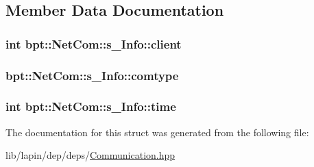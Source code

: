 \subsection{Member Data Documentation}
\hypertarget{structbpt_1_1_net_com_1_1s___info_ae2ea56fb236b6a24a720751e0b70b1d1}{
\subsubsection[{client}]{ {\bf int} bpt\-::\-Net\-Com\-::s\-\_\-\-Info\-::client}}\label{structbpt_1_1_net_com_1_1s___info_ae2ea56fb236b6a24a720751e0b70b1d1}
\hypertarget{structbpt_1_1_net_com_1_1s___info_a04de21638bff33bd3459fc95e34f07c7}{
\subsubsection[{comtype}]{ bpt\-::\-Net\-Com\-::s\-\_\-\-Info\-::comtype}}\label{structbpt_1_1_net_com_1_1s___info_a04de21638bff33bd3459fc95e34f07c7}
\hypertarget{structbpt_1_1_net_com_1_1s___info_ad76e1792d9b3057751a844b1fffbb635}{
\subsubsection[{time}]{ {\bf int} bpt\-::\-Net\-Com\-::s\-\_\-\-Info\-::time}}\label{structbpt_1_1_net_com_1_1s___info_ad76e1792d9b3057751a844b1fffbb635}


The documentation for this struct was generated from the following file\-:\begin{DoxyCompactItemize}
\item 
lib/lapin/dep/deps/\hyperlink{_communication_8hpp}{Communication.\-hpp}\end{DoxyCompactItemize}
